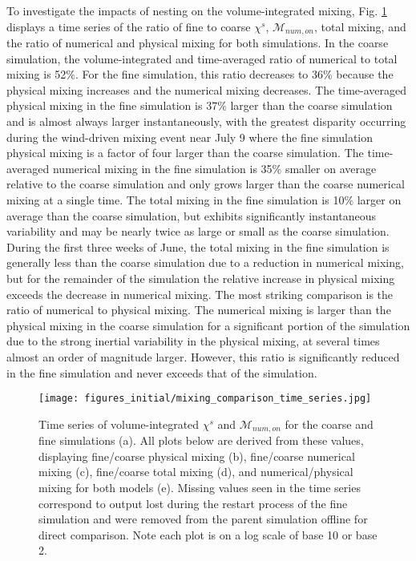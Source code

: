\documentclass[draft]{agujournal2019}
\begin{document}
To investigate the impacts of nesting on the volume-integrated mixing, Fig. \ref{fig:volume-integrated} displays a time series of the ratio of fine to coarse $\chi^s$, $\mathcal{M}_{num, on}$, total mixing, and the ratio of numerical and physical mixing for both simulations. In the coarse simulation, the volume-integrated and time-averaged ratio of numerical to total mixing is 52$\%$. For the fine simulation, this ratio decreases to 36$\%$ because the physical mixing increases and the numerical mixing decreases. The time-averaged physical mixing in the fine simulation is 37$\%$ larger than the coarse simulation and is almost always larger instantaneously, with the greatest disparity occurring during the wind-driven mixing event near July 9 where the fine simulation physical mixing is a factor of four larger than the coarse simulation.  The time-averaged numerical mixing in the fine simulation is 35$\%$ smaller on average relative to the coarse simulation and only grows larger than the coarse numerical mixing at a single time. The total mixing in the fine simulation is 10$\%$ larger on average than the coarse simulation, but exhibits significantly instantaneous variability and may be nearly twice as large or small as the coarse simulation. During the first three weeks of June, the total mixing in the fine simulation is generally less than the coarse simulation due to a reduction in numerical mixing, but for the remainder of the simulation the relative increase in physical mixing exceeds the decrease in numerical mixing. The most striking comparison is the ratio of numerical to physical mixing. The numerical mixing is larger than the physical mixing in the coarse simulation for a significant portion of the simulation due to the strong inertial variability in the physical mixing, at several times almost an order of magnitude larger. However, this ratio is significantly reduced in the fine simulation and never exceeds that of the simulation. 

\begin{figure}[ht!]
 \centerline{\texttt{[image: figures\_initial/mixing\_comparison\_time\_series.jpg]}}
  \caption{Time series of volume-integrated $\chi^s$ and $\mathcal{M}_{num, on}$ for the coarse and fine simulations (a). All plots below are derived from these values, displaying fine/coarse physical mixing (b), fine/coarse numerical mixing (c), fine/coarse total mixing (d), and numerical/physical mixing for both models (e). Missing values seen in the time series correspond to output lost during the restart process of the fine simulation and were removed from the parent simulation offline for direct comparison. Note each plot is on a log scale of base 10 or base 2.}
  \label{fig:volume-integrated}
\end{figure}
\end{document}
